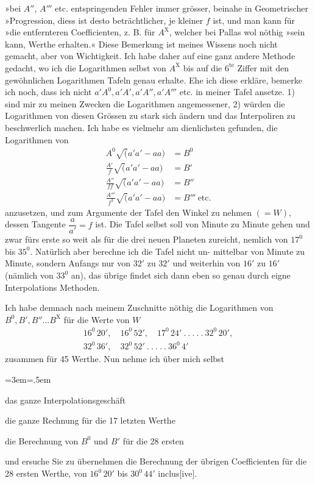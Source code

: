 »bei $A''$, $A'''$ etc. entspringenden Fehler immer grösser, beinahe in Geometrischer\newline
»Progression, diess ist desto beträchtlicher, je kleiner $f$ ist, und man kann für\newline
»die entfernteren Coefficienten, z. B. für $A^{\mathrm X}$, welcher bei Pallas wol nöthig\newline
»sein kann,  Werthe erhalten.« Diese Bemerkung ist meines Wissens noch nicht gemacht, aber von Wichtigkeit. Ich habe daher auf eine ganz andere Methode gedacht, wo ich die Logarithmen selbst von $A^{\mathrm X}$ bis auf die $6^{\mathrm{te}}$ Ziffer mit den gewöhnlichen Logarithmen Tafeln genau erhalte. Ehe ich diese erkläre, bemerke ich noch, dass ich nicht $a'A^0,a'A',a'A'',a'A'''$ etc. in meiner Tafel ansetze. 1) sind mir zu meinen Zwecken die Logarithmen angemessener, 2) würden die Logarithmen von diesen Grössen zu stark sich ändern und das Interpoliren zu beschwerlich machen. Ich habe es vielmehr am dienlichsten gefunden, die Logarithmen von
\[
\begin{aligned}
A^0\surd(a'a'-aa)&=B^0\\[.5em]
\frac{A'}f\surd(a'a'-aa)&=B'\\[.5em]
\frac{A''}{ff}\surd(a'a'-aa)&=B''\\[.5em]
\frac{A'''}{f^3}\surd(a'a'-aa)&=B'''\ \text{etc.}
\end{aligned}
\]
\noindent anzusetzen, und zum Argumente der Tafel den Winkel zu nehmen $(=W)$, dessen Tangente $\dfrac a{a'}=f$ ist. Die Tafel selbst soll von Minute zu Minute gehen und zwar fürs erste so weit als für die drei neuen Planeten zureicht, nemlich von $17^0$ bis $35^0$. Natürlich aber berechne ich die Tafel nicht un-
\clearpage
{}
\noindent mittelbar von Minute zu Minute, sondern Anfangs nur von $32'$ zu $32'$ und weiterhin von $16'$ zu $16'$ (nämlich von $33^0$ an), das übrige findet sich dann eben so genau durch eigne Interpolations Methoden.

\par\indent Ich habe demnach nach meinem Zuschnitte nöthig\newline
die Logarithmen von $B^0,B',B''\ldots B^{\mathrm X}$ für die Werte von $W$
\[
\begin{gathered}
16^0\,20',\quad16^0\,52',\quad17^0\,24'\ .\ .\ .\ .\ .\ 32^0\,20',\\
32^0\,36',\quad32^0\,52'\ .\ .\ .\ .\ .\ 36^0\,4'
\end{gathered}
\]
\noindent zusammen für 45 Werthe. Nun nehme ich über mich selbst
\begin{list}{}{\leftmargin=3em\itemsep=0pt\parsep=0pt\topsep=.5em}
\item[1)] das ganze Interpolationsgeschäft
\item[2)] die ganze Rechnung für die 17 letzten Werthe
\item[3)] die Berechnung von $B^0$ und $B'$ für die 28 ersten
\end{list}
\noindent und ersuche Sie zu übernehmen die Berechnung der übrigen Coefficienten für die 28 ersten Werthe, von $16^0\,20'$ bis $30^0\,44'$ inclus[ive].

